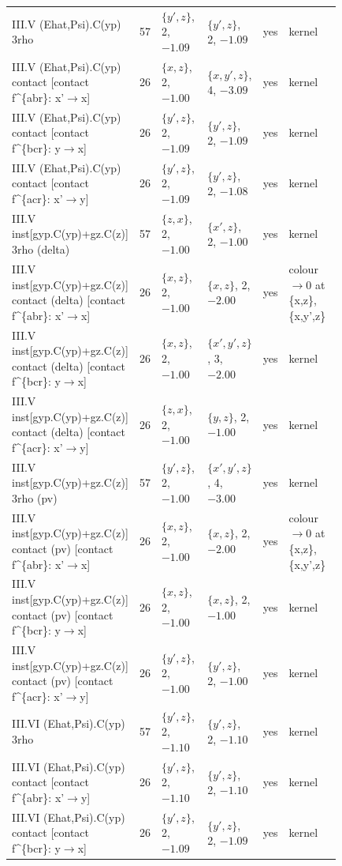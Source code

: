 \documentclass[9pt]{article}
\numberwithin{equation}{section}
\begin{document}
{\begin{center}
\begin{tabular}{|p{0.36\linewidth}|c|p{0.15\linewidth}|p{0.15\linewidth}|c|p{0.17\linewidth}|}
III.V (Ehat,Psi).C(yp) 3rho & 57 & $\{y',z\}$, 2, $-1.09$ & $\{y',z\}$, 2, $-1.09$ & yes & kernel\\
III.V (Ehat,Psi).C(yp) contact [contact f\^{}\{abr\}: x'$\to$x] & 26 & $\{x,z\}$, 2, $-1.00$ & $\{x,y',z\}$, 4, $-3.09$ & yes & kernel\\
III.V (Ehat,Psi).C(yp) contact [contact f\^{}\{bcr\}: y$\to$x] & 26 & $\{y',z\}$, 2, $-1.09$ & $\{y',z\}$, 2, $-1.09$ & yes & kernel\\
III.V (Ehat,Psi).C(yp) contact [contact f\^{}\{acr\}: x'$\to$y] & 26 & $\{y',z\}$, 2, $-1.09$ & $\{y',z\}$, 2, $-1.08$ & yes & kernel\\
III.V inst[gyp.C(yp)+gz.C(z)] 3rho (delta) & 57 & $\{z,x\}$, 2, $-1.00$ & $\{x',z\}$, 2, $-1.00$ & yes & kernel\\
III.V inst[gyp.C(yp)+gz.C(z)] contact (delta) [contact f\^{}\{abr\}: x'$\to$x] & 26 & $\{x,z\}$, 2, $-1.00$ & $\{x,z\}$, 2, $-2.00$ & yes & colour $\to0$ at \{x,z\}, \{x,y',z\}\\
III.V inst[gyp.C(yp)+gz.C(z)] contact (delta) [contact f\^{}\{bcr\}: y$\to$x] & 26 & $\{x,z\}$, 2, $-1.00$ & $\{x',y',z\}$, 3, $-2.00$ & yes & kernel\\
III.V inst[gyp.C(yp)+gz.C(z)] contact (delta) [contact f\^{}\{acr\}: x'$\to$y] & 26 & $\{z,x\}$, 2, $-1.00$ & $\{y,z\}$, 2, $-1.00$ & yes & kernel\\
III.V inst[gyp.C(yp)+gz.C(z)] 3rho (pv) & 57 & $\{y',z\}$, 2, $-1.00$ & $\{x',y',z\}$, 4, $-3.00$ & yes & kernel\\
III.V inst[gyp.C(yp)+gz.C(z)] contact (pv) [contact f\^{}\{abr\}: x'$\to$x] & 26 & $\{x,z\}$, 2, $-1.00$ & $\{x,z\}$, 2, $-2.00$ & yes & colour $\to0$ at \{x,z\}, \{x,y',z\}\\
III.V inst[gyp.C(yp)+gz.C(z)] contact (pv) [contact f\^{}\{bcr\}: y$\to$x] & 26 & $\{x,z\}$, 2, $-1.00$ & $\{x,z\}$, 2, $-1.00$ & yes & kernel\\
III.V inst[gyp.C(yp)+gz.C(z)] contact (pv) [contact f\^{}\{acr\}: x'$\to$y] & 26 & $\{y',z\}$, 2, $-1.00$ & $\{y',z\}$, 2, $-1.00$ & yes & kernel\\
III.VI (Ehat,Psi).C(yp) 3rho & 57 & $\{y',z\}$, 2, $-1.10$ & $\{y',z\}$, 2, $-1.10$ & yes & kernel\\
III.VI (Ehat,Psi).C(yp) contact [contact f\^{}\{abr\}: x'$\to$y] & 26 & $\{y',z\}$, 2, $-1.10$ & $\{y',z\}$, 2, $-1.10$ & yes & kernel\\
III.VI (Ehat,Psi).C(yp) contact [contact f\^{}\{bcr\}: y$\to$x] & 26 & $\{y',z\}$, 2, $-1.09$ & $\{y',z\}$, 2, $-1.09$ & yes & kernel\\

\end{tabular}
\end{center}}
\end{document}
